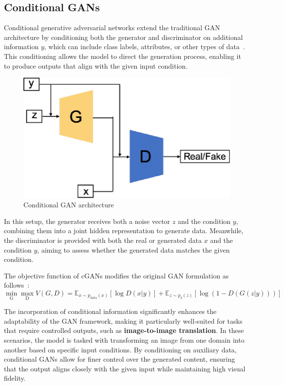 \documentclass[12pt,DIV14,BCOR12mm,a4paper,footinclude=false,headinclude,parskip=half-,twoside,openright,cleardoublepage=empty,toc=index,bibliography=totoc,listof=totoc]{scrreprt}
\numberwithin{equation}{chapter}
\begin{document}
\subsection{Conditional GANs}
Conditional generative adversarial networks extend the traditional GAN architecture by conditioning both the generator and discriminator on additional information \( y \), which can include class labels, attributes, or other types of data~\cite{devries2019evaluation}. This conditioning allows the model to direct the generation process, enabling it to produce outputs that align with the given input condition. 
\begin{figure}
	\centering
	\includegraphics[scale=.9]{../media/Conditional-GAN-architecture.png}
	\caption{Conditional GAN architecture~\cite{eckerli2021generative}}
	\label{cGAN}
\end{figure}
In this setup, the generator receives both a noise vector \( z \) and the condition \( y \), combining them into a joint hidden representation to generate data. Meanwhile, the discriminator is provided with both the real or generated data \( x \) and the condition \( y \), aiming to assess whether the generated data matches the given condition.

The objective function of cGANs modifies the original GAN formulation as follows~\cite{gauthier2014conditional}:
\begin{equation}
\min_{\text{G}} \max_{\text{D}} V(G, D) = \mathbb{E}_{x \sim p_{\text{data}}(x)} \left[\log D(x|y)\right] + \mathbb{E}_{z \sim p_{\text{z}}(z)} \left[\log(1 - D(G(z|y)))\right]
\end{equation}


The incorporation of conditional information significantly enhances the adaptability of the GAN framework, making it particularly well-suited for tasks that require controlled outputs, such as \textbf{image-to-image translation}. In these scenarios, the model is tasked with transforming an image from one domain into another based on specific input conditions. By conditioning on auxiliary data, conditional GANs allow for finer control over the generated content, ensuring that the output aligns closely with the given input while maintaining high visual fidelity.
\end{document}
